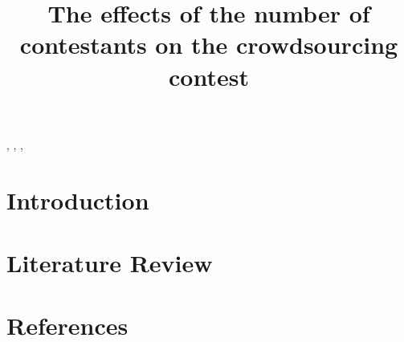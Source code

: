 \documentclass[review,11pt]{elsarticle}
\theoremstyle{definition}
\theoremstyle{remark}
\begin{document}
\renewcommand{\baselinestretch}{1.5}
\title{The effects of the number of contestants on the crowdsourcing  contest}
\author[ustc]{}

\author[ustc]{}

\author[ustc]{}




\address[ustc]{The School of Management, University of Science and Technology of China, Hefei 230026, China}



\begin{abstract}

\end{abstract}
\begin{keyword}
\sep
\sep
\sep

 \end{keyword}

\maketitle
\section{Introduction}

\section{Literature Review}

\section*{References}
\end{document}
